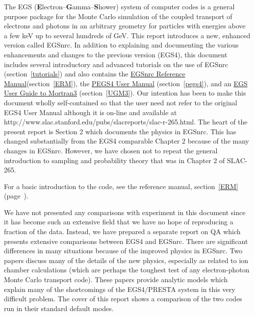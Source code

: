 The EGS ({\bfseries E}lectron--{\bfseries G}amma--{\bfseries S}hower) system of computer codes is a general purpose package
for the Monte Carlo simulation of the coupled transport of electrons and
photons in an arbitrary geometry for particles with energies above a few
keV up to several hundreds of GeV.  This report introduces a new, enhanced version
called EGSnrc. In addition to explaining and documenting the various
enhancements and changes to the previous version (EGS4\cite{Ne85}),
this document includes several introductory and advanced tutorials
on the use of EGSnrc (section~\ref{tutorials}) and also contains
the \underline{EGSnrc Reference Manual}(section~\ref{ERM}),
the \underline{PEGS4 User Manual} (section~\ref{pegs4}), and
an \underline{EGS User Guide to Mortran3} (section~\ref{UGM3}).
Our intention has been to make this document wholly self-contained so
that the user need not refer to the original EGS4 User Manual\cite{Ne85}
although it is on-line and available at 
{http://www.slac.stanford.edu/pubs/slacreports/slac-r-265.html}.
The heart of the present report is Section 2 which documents the physics
in EGSnrc. This has changed substantially from the EGS4 comparable Chapter
2 because of the many changes in EGSnrc. However, we have chosen not to
repeat the general introduction to sampling and probability theory that
was in Chapter 2 of SLAC-265.

For a basic introduction to the code, see the reference manual,
section~\ref{ERM} (page~\pageref{ERM}).

We have not presented any comparisons with experiment in this
document since it has become such an extensive field that we have no
hope of reproducing a fraction of the data. Instead, we have prepared
a separate report on QA which presents extensive comparisons between
EGS4 and EGSnrc\cite{Wa00}. There are
significant differences in many situations because of the improved physics
in EGSnrc.  Two papers\cite{Ka99a,Ka99b} discuss many
of the details of the new physics, especially as related to ion chamber
calculations (which are perhaps the toughest test of any electron-photon
Monte Carlo transport code).  These papers provide analytic models which
explain many of the shortcomings of the EGS4/PRESTA system in this very
difficult problem.  The cover of this report shows a
comparison of the two codes run in their standard default modes.

